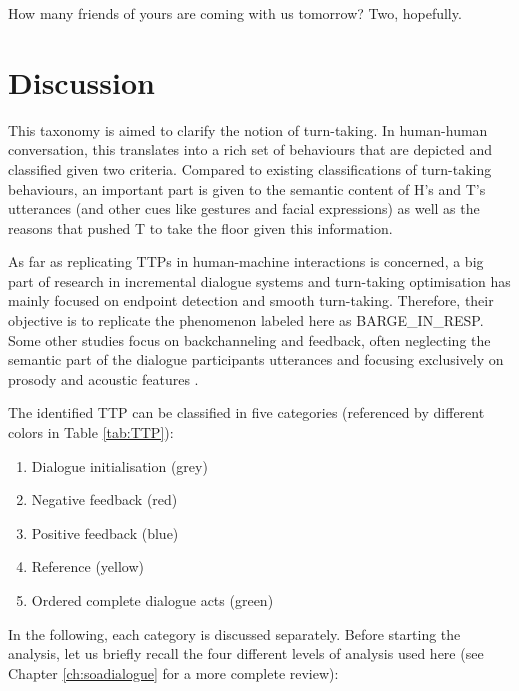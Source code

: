                     	\begin{dialogue}
							 How many friends of yours are coming with us tomorrow?
							 Two, hopefully.
						\end{dialogue}

\section{Discussion}

	This taxonomy is aimed to clarify the notion of turn-taking. In human-human conversation, this translates into a rich set of behaviours that are depicted and classified given two criteria. Compared to existing classifications of turn-taking behaviours, an important part is given to the semantic content of H's and T's utterances (and other cues like gestures and facial expressions) as well as the reasons that pushed T to take the floor given this information.

    As far as replicating TTPs in human-machine interactions is concerned, a big part of research in incremental dialogue systems and turn-taking optimisation has mainly focused on endpoint detection \cite{Raux2008} and smooth turn-taking. Therefore, their objective is to replicate the phenomenon labeled here as BARGE\_IN\_RESP. Some other studies focus on backchanneling and feedback, often neglecting the semantic part of the dialogue participants utterances and focusing exclusively on prosody and acoustic features \cite{Baumann2008,Jonsdottir2008}.

    The identified TTP can be classified in five categories (referenced by different colors in Table \ref{tab:TTP}):
    
    \begin{enumerate}
      \item Dialogue initialisation (grey)
      \item Negative feedback (red)
      \item Positive feedback (blue)
      \item Reference (yellow)
      \item Ordered complete dialogue acts (green)
    \end{enumerate}

    In the following, each category is discussed separately. Before starting the analysis, let us briefly recall the four different levels of analysis used here (see Chapter \ref{ch:soadialogue} for a more complete review):
		
